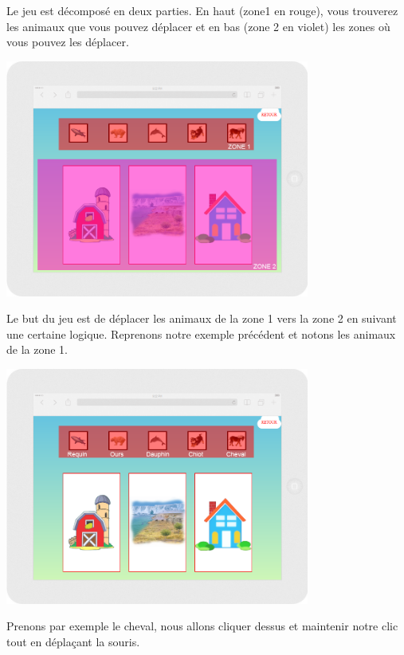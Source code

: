 \documentclass{article}
\begin{document}
Le jeu est décomposé en deux parties. En haut (zone1 en rouge), vous trouverez les animaux que vous pouvez déplacer et en bas (zone 2 en violet) les zones o\`u vous pouvez les déplacer.
\vspace{0.5cm}
\begin{center}
\includegraphics[width=0.75\textwidth]{zone}
\end{center}
\vspace{0.5cm}
Le but du jeu est de déplacer les animaux de la zone 1 vers la zone 2 en suivant une certaine logique. Reprenons notre exemple précédent et notons les animaux de la zone 1.\\
\vspace{0.5cm}
\begin{center}
\includegraphics[width=0.75\textwidth]{zone1}
\end{center}
\vspace{0.5cm}
Prenons par exemple le cheval, nous allons cliquer dessus et maintenir notre clic tout en dépla\c{c}ant la souris.
\vspace{0.5cm}\\
\end{document}
